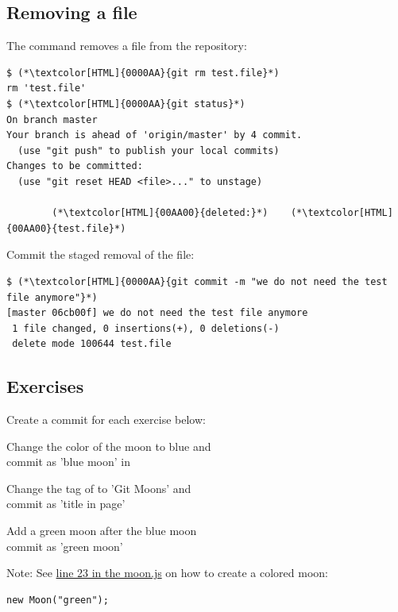 \subsection{Removing a file}
\begin{frame}[fragile]
\subslidetitle
  The command  removes a file from the repository:
\begin{lstlisting}
$ (*\textcolor[HTML]{0000AA}{git rm test.file}*)
rm 'test.file'
$ (*\textcolor[HTML]{0000AA}{git status}*)
On branch master
Your branch is ahead of 'origin/master' by 4 commit.
  (use "git push" to publish your local commits)
Changes to be committed:
  (use "git reset HEAD <file>..." to unstage)

        (*\textcolor[HTML]{00AA00}{deleted:}*)    (*\textcolor[HTML]{00AA00}{test.file}*)
\end{lstlisting}

  Commit the staged removal of the file:
  \begin{lstlisting}
$ (*\textcolor[HTML]{0000AA}{git commit -m "we do not need the test file anymore"}*)
[master 06cb00f] we do not need the test file anymore
 1 file changed, 0 insertions(+), 0 deletions(-)
 delete mode 100644 test.file
\end{lstlisting}

\end{frame}

\subsection{Exercises}
\begin{frame}[fragile]
\subslidetitle
  Create a commit for each exercise below:
  \begin{exercise}
    \item Change the color of the moon to blue and\\
      commit as 'blue moon' in 
    \item Change the  tag of  to 'Git Moons' and\\
      commit as 'title in page'
    \item Add a green moon after the blue moon\\
      commit as 'green moon'
  \end{exercise}

  \vspace{3em}
  Note: See \href{https://github.com/segfault-trainings/gitmoon/blob/master/moon.js#L23}{line 23 in the moon.js}
    on how to create a colored moon:
  \begin{lstlisting}[keywords={new},stringstyle=\color{mauve}]
new Moon("green");
\end{lstlisting}

\end{frame}

